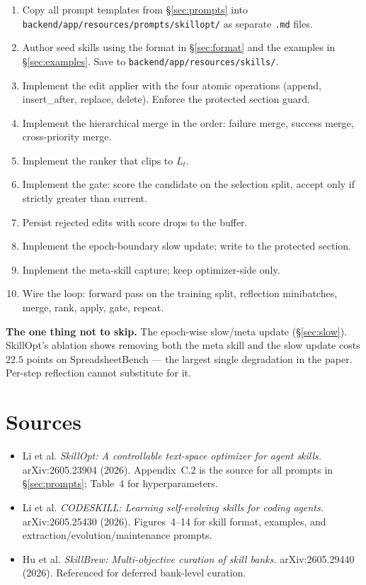 \documentclass[11pt,a4paper]{article}
\begin{document}
\begin{enumerate}[leftmargin=1.4em]
  \item Copy all prompt templates from \S\ref{sec:prompts} into
  \texttt{backend/app/resources/prompts/skillopt/} as separate
  \texttt{.md} files.
  \item Author seed skills using the format in \S\ref{sec:format} and the
  examples in \S\ref{sec:examples}. Save to\newline
  \texttt{backend/app/resources/skills/}.
  \item Implement the edit applier with the four atomic operations
  (append, insert\_after, replace, delete). Enforce the protected
  section guard.
  \item Implement the hierarchical merge in the order: failure merge,
  success merge, cross-priority merge.
  \item Implement the ranker that clips to \(L_t\).
  \item Implement the gate: score the candidate on the selection split,
  accept only if strictly greater than current.
  \item Persist rejected edits with score drops to the buffer.
  \item Implement the epoch-boundary slow update; write to the
  protected section.
  \item Implement the meta-skill capture; keep optimizer-side only.
  \item Wire the loop: forward pass on the training split, reflection
  minibatches, merge, rank, apply, gate, repeat.
\end{enumerate}

\begin{keybox}
\textbf{The one thing not to skip.} The epoch-wise slow/meta update
(\S\ref{sec:slow}). SkillOpt's ablation shows removing both the meta
skill and the slow update costs \(22.5\) points on SpreadsheetBench ---
the largest single degradation in the paper. Per-step reflection cannot
substitute for it.
\end{keybox}

\section{Sources}

\begin{itemize}[leftmargin=1.4em]
  \item Li et al. \emph{SkillOpt: A controllable text-space optimizer
  for agent skills.} arXiv:2605.23904 (2026). Appendix~C.2 is the
  source for all prompts in \S\ref{sec:prompts}; Table~4 for
  hyperparameters.
  \item Li et al. \emph{CODESKILL: Learning self-evolving skills for
  coding agents.} arXiv:2605.25430 (2026). Figures~4--14 for skill
  format, examples, and extraction/evolution/maintenance prompts.
  \item Hu et al. \emph{SkillBrew: Multi-objective curation of skill
  banks.} arXiv:2605.29440 (2026). Referenced for deferred bank-level
  curation.
\end{itemize}
\end{document}
